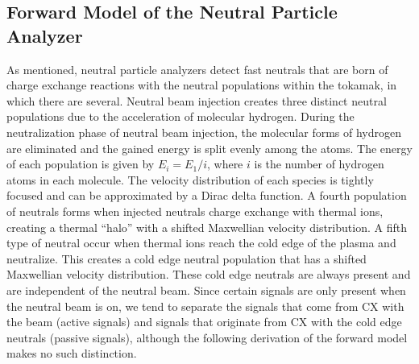 \subsection{Forward Model of the Neutral Particle Analyzer}
As mentioned, neutral particle analyzers detect fast neutrals that are born of charge exchange reactions with the neutral populations within the tokamak, in which there are several.
Neutral beam injection creates three distinct neutral populations due to the acceleration of molecular hydrogen.
During the neutralization phase of neutral beam injection, the molecular forms of hydrogen are eliminated and the gained energy is split evenly among the atoms.
The energy of each population is given by $E_i = E_1/i$, where $i$ is the number of hydrogen atoms in each molecule.
The velocity distribution of each species is tightly focused and can be approximated by a Dirac delta function.
A fourth population of neutrals forms when injected neutrals charge exchange with thermal ions, creating a thermal ``halo'' with a shifted Maxwellian velocity distribution. A fifth type of neutral occur when thermal ions reach the cold edge of the plasma and neutralize. This creates a cold edge neutral population that has a shifted Maxwellian velocity distribution. These cold edge neutrals are always present and are independent of the neutral beam. Since certain signals are only present when the neutral beam is on, we tend to separate the signals that come from CX with the beam (active signals) and signals that originate from CX with the cold edge neutrals (passive signals), although the following derivation of the forward model makes no such distinction.

